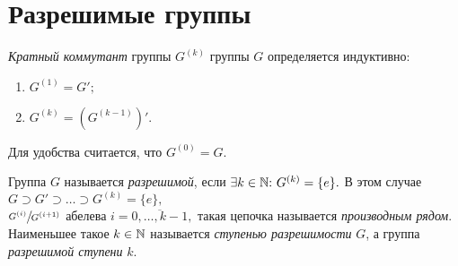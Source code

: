 \newpage
        \section{Разрешимые группы}
        \setcounter{definition}{0}
        \begin{definition}
        \textit{Кратный коммутант} группы $G^{(k)}$ группы $G$ определяется индуктивно:
            \begin{enumerate}
                \setlength\itemsep{0.1em}
                \item ${G^{(1)} = G';}$
                \item ${G^{(k)} = (G^{(k - 1)})'.}$
            \end{enumerate}
        Для удобства считается, что ${G^{(0)} = G.}$
        \end{definition}

        \begin{definition}
            Группа $G$ называется \textit{разрешимой}, если ${\exists k \in \mathbb{N}{:}{ } \  G^{(k)} = \{e\}.}$ В этом случае ${G \supset G' \supset \ldots \supset G^{(k)} = \{e\},}$\\ ${\sfrac{G^{(i)}}{G^{(i + 1)}}}$ абелева ${i = \overline{0, \ldots, k - 1},}$ такая цепочка называется \textit{производным рядом}.
            Наименьшее такое ${k \in \mathbb{N}}$ называется \textit{ступенью разрешимости} $G$, а группа \textit{разрешимой ступени} $k$.
        \end{definition}

